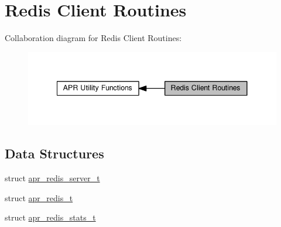 \hypertarget{group__APR__Util__RC}{}\section{Redis Client Routines}
\label{group__APR__Util__RC}
Collaboration diagram for Redis Client Routines\+:
\nopagebreak
\begin{figure}[H]
\begin{center}
\leavevmode
\includegraphics[width=341pt]{group__APR__Util__RC}
\end{center}
\end{figure}
\subsection*{Data Structures}
\begin{DoxyCompactItemize}
\item 
struct \hyperlink{structapr__redis__server__t}{apr\+\_\+redis\+\_\+server\+\_\+t}
\item 
struct \hyperlink{structapr__redis__t}{apr\+\_\+redis\+\_\+t}
\item 
struct \hyperlink{structapr__redis__stats__t}{apr\+\_\+redis\+\_\+stats\+\_\+t}
\end{DoxyCompactItemize}
